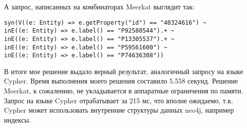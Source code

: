 А запрос, написанных на комбинаторах Meerkat выглядит так:
\begin{lstlisting}
syn(V((e: Entity) => e.getProperty("id") == "40324616") ~
inE((e: Entity) => e.label() == "P92580544").+ ~
inE((e: Entity) => e.label() == "P13305537").+ ~
inE((e: Entity) => e.label() == "P59561600") ~
inE((e: Entity) => e.label() == "P74636308"))
\end{lstlisting}

В итоге мое решение выдало верный результат, аналогичный запросу на языке Cypher. Время выполнения моего решения составило 5.558 секунд. Решение Meerkat, к сожалению, не укладывается в аппаратные ограничения по памяти. Запрос на языке Cypher отрабатывает за 215 мс, что вполне ожидаемо, т.к. Cypher может использовать внутренние структуры данных neo4j, например индексы. 
